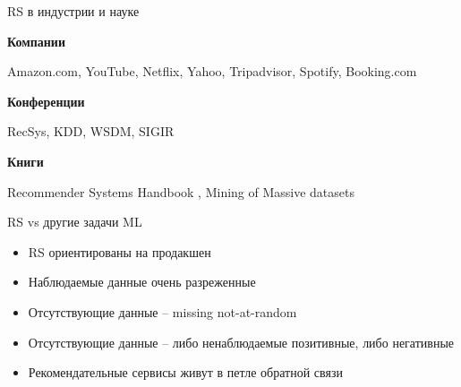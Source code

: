 \documentclass[11pt,aspectratio=169,handout]{beamer}
\begin{document}
{
\begin{frame}[plain]
\end{frame}
}

{
\begin{frame}[plain]
\end{frame}
}

{
\begin{frame}[plain]
\end{frame}
}

{
\begin{frame}[plain]
\end{frame}
}

{
\begin{frame}[plain]
\end{frame}
}

{
\begin{frame}[plain]
\end{frame}
}

{
\begin{frame}[plain]
\end{frame}
}

\begin{frame}{RS в индустрии и науке}

{\bf Компании}

Amazon.com, YouTube, Netflix, Yahoo, Tripadvisor, Spotify, Booking.com

\vfill

{\bf Конференции}

RecSys, KDD, WSDM, SIGIR

\vfill

{\bf Книги}

Recommender Systems Handbook \cite{RSHB}, Mining of Massive datasets \cite{MMDS}

\end{frame}

\begin{frame}{RS vs другие задачи ML \cite{NETFLIX}}

\begin{itemize}[<+->]
\item RS ориентированы на продакшен
\item Наблюдаемые данные очень разреженные
\item Отсутствующие данные -- missing not-at-random
\item Отсутствующие данные -- либо ненаблюдаемые позитивные, либо негативные
\item Рекомендательные сервисы живут в петле обратной связи
\end{itemize}

\end{frame}
\end{document}
